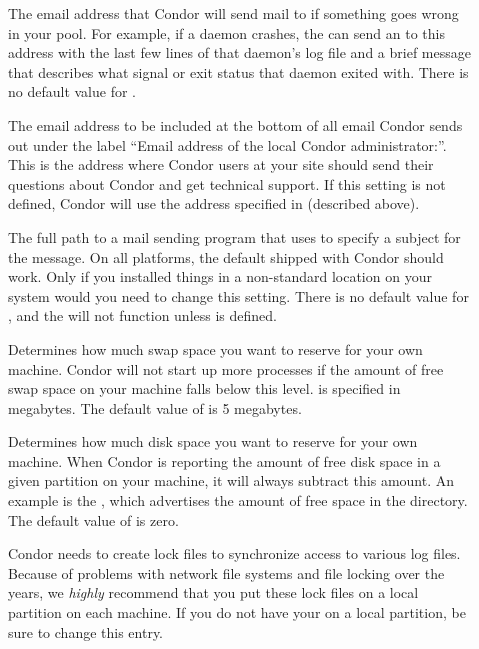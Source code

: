 \begin{description}
\item[] \label{param:CondorAdmin} The email
  address that Condor will send mail to if something goes wrong in
  your pool.  For example, if a daemon crashes, the 
  can send an  to this address with the last few lines
  of that daemon's log file and a brief message that describes what
  signal or exit status that daemon exited with.  There is no default
  value for .
  
\item[] \label{param:CondorSupportEmail}
  The email address to be included at the bottom of all email Condor
  sends out under the label ``Email address of the local Condor
  administrator:''.  
  This is the address where Condor users at your site should send
  their questions about Condor and get technical support.
  If this setting is not defined, Condor will use the address
  specified in  (described above).

\item[] \label{param:Mail} The full path to a mail
  sending program that uses  to specify a subject for the
  message.  On all platforms, the default shipped with Condor should
  work.  Only if you installed things in a non-standard location on
  your system would you need to change this setting.  There is no
  default value for , and the  will not
  function unless  is defined.

\item[] \label{param:ReservedSwap} Determines
  how much swap space you want to reserve for your own machine.
  Condor will not start up more  processes if the
  amount of free swap space on your machine falls below this level.
   is specified in megabytes.  The default value
  of  is 5 megabytes.

\item[] \label{param:ReservedDisk} Determines
  how much disk space you want to reserve for your own machine.  When
  Condor is reporting the amount of free disk space in a given
  partition on your machine, it will always subtract this amount.  An
  example is the , which advertises the amount of free
  space in the  directory.  The default value of
   is zero.
  
\item[] \label{param:Lock} Condor needs to create
  lock files to synchronize access to various log files.  Because of
  problems with network file systems and file locking over
  the years, we \emph{highly} recommend that you put these lock
  files on a local partition on each machine.  If you do not have your
   on a local partition, be sure to change this
  entry.


\end{description}
